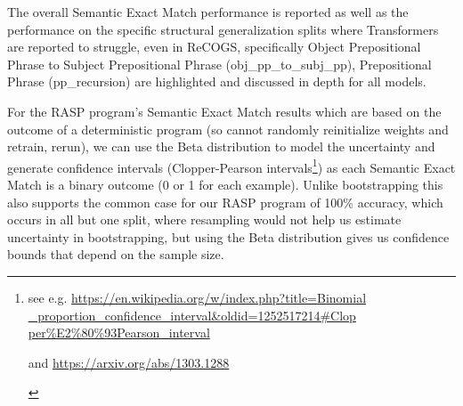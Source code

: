 \documentclass[11pt]{article}
\begin{document}
The overall Semantic Exact Match performance is reported as well as the performance on the specific structural generalization splits where Transformers are reported to struggle, even in ReCOGS, specifically Object Prepositional Phrase to Subject Prepositional Phrase (obj\_pp\_to\_subj\_pp),
Prepositional Phrase (pp\_recursion) are highlighted and discussed in depth for all models.

For the RASP program's Semantic Exact Match results which are based on the outcome of a deterministic program (so cannot randomly reinitialize weights and retrain, rerun),
we can use the Beta distribution to model the uncertainty and generate confidence intervals (Clopper-Pearson intervals\footnote{\begin{footnotesize}see e.g. \href{https://en.wikipedia.org/w/index.php?title=Binomial\_proportion\_confidence\_interval\&oldid=1252517214\#Clopper\%E2\%80\%93Pearson\_interval}{https://en.wikipedia.org/w/index.php?title=Binomial
\_proportion\_confidence\_interval\&oldid=1252517214\#Clop
per\%E2\%80\%93Pearson\_interval}

and \href{https://arxiv.org/abs/1303.1288}{https://arxiv.org/abs/1303.1288}
\end{footnotesize}
}) as each Semantic Exact Match is a binary outcome (0 or 1 for each example). Unlike bootstrapping this also supports the common case for our RASP program of 100\% accuracy, which occurs in all but one split, where resampling would not help us estimate uncertainty in bootstrapping, but using the Beta distribution gives us confidence bounds that depend on the sample size.
\end{document}
